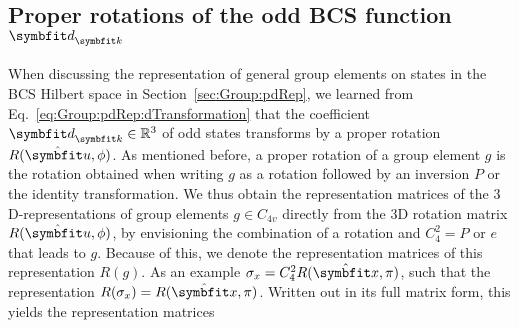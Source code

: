 \subsection{Proper rotations of the odd BCS function $\v{d}_\v{k}$}
\label{sec:Group:Symm:dRepresentation}

When discussing the representation of general group elements on states in the BCS Hilbert space in Section~\ref{sec:Group:pdRep}, we learned from
Eq.~\eqref{eq:Group:pdRep:dTransformation} that the coefficient $\v{d}_\v{k}\in\mathbb{R}^3$ of odd states transforms by a proper rotation $R(\hat{\v{u}},\phi)$.
As mentioned before, a proper rotation of a group element $g$ is the rotation obtained when writing $g$ as a rotation followed by an inversion $P$ or the identity transformation. We thus
obtain the representation matrices of the $3$D-representations of group elements $g\in C_{4v}$ directly from the $3$D rotation matrix $R(\hat{\v{u}},\phi)$, by
envisioning the combination of a rotation and $C_{4}^2=P$ or $e$ that leads to $g$. Because of this, we denote the representation matrices of this
representation $R(g)$. As an example $\sigma_x = C_4^2R(\hat{\v{x}},\pi)$, such that the representation $R(\sigma_x) = R(\hat{\v{x}},\pi)$. Written
out in its full matrix form, this yields the representation matrices
%

